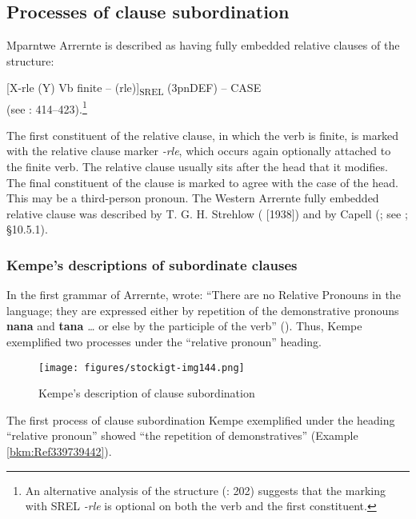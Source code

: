 \subsection{Processes of clause subordination}
\label{sec:key:9.3.5}\label{bkm:Ref73463231}

Mparntwe Arrernte is described as having fully embedded relative clauses of the structure:

\ea{}
[X-rle (Y) Vb finite – (rle)]\textsubscript{SREL} (3pnDEF) – CASE  \\
(see \citealt{Wilkins1989}: 414--423).\footnote{An alternative analysis of the structure (\citealt{henderson_eastern_1994}: 202) suggests that the marking with SREL \textit{-rle} is optional on both the verb and the first constituent.}
\z

The first constituent of the relative clause, in which the verb is finite, is marked with the relative clause marker \textit{-rle}, which occurs again optionally attached to the finite verb. The relative clause usually sits after the head that it modifies. The final constituent of the clause is marked to agree with the case of the head. This may be a third-person pronoun. The Western Arrernte fully embedded relative clause was described by T. G. H. Strehlow (\citealt{strehlow_aranda_1944} [1938]) and by Capell (\citeyear{capell_outline_1958}; see \citealt{Stockigt2017}; §10.5.1).

\subsubsection{Kempe’s descriptions of subordinate clauses}
\label{sec:key:9.3.5.1}\label{bkm:Ref339746464}\label{bkm:Ref74837096}\label{bkm:Ref339794217}

In the first grammar of Arrernte, \citet[11]{kempe_grammar_1891} wrote: “There are no Relative Pronouns in the language; they are expressed either by repetition of the demonstrative pronouns \textbf{nana} and \textbf{tana} \textit{…} or else by the participle of the verb” (). Thus, Kempe exemplified two processes under the ``relative pronoun'' heading.


\begin{figure}
\texttt{[image: figures/stockigt-img144.png]}
\caption{Kempe’s description of clause subordination \citeyearpar[11]{kempe_grammar_1891}}
\label{bkm:Ref339787226}
\label{fig:key:9-198}
\label{fig:key:198}
\end{figure}

The first process of clause subordination Kempe exemplified under the heading “relative pronoun” showed “the repetition of demonstratives” (Example \ref{bkm:Ref339739442}).

